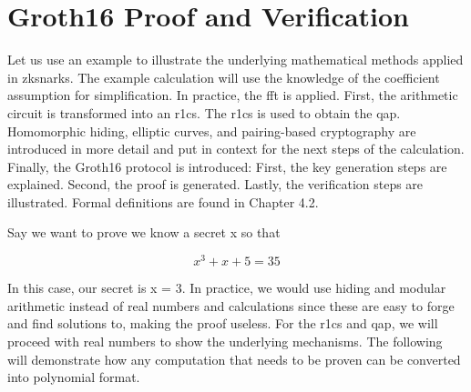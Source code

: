 \section{Groth16 Proof and Verification}
Let us use an example to illustrate the underlying mathematical methods applied in \acrshort{zksnark}s. The example calculation will use the knowledge of the coefficient assumption for simplification. In practice, the \acrshort{fft} is applied. First, the arithmetic circuit is transformed into an \acrshort{r1cs}. The \acrshort{r1cs} is used to obtain the \acrshort{qap}. Homomorphic hiding, elliptic curves, and pairing-based cryptography are introduced in more detail and put in context for the next steps of the calculation. Finally, the Groth16 protocol is introduced: First, the key generation steps are explained. Second, the proof is generated. Lastly, the verification steps are illustrated. Formal definitions are found in Chapter 4.2.

Say we want to prove we know a secret x so that

\[x^3 + x + 5 = 35\]

In this case, our secret is x = 3.
In practice, we would use hiding and modular arithmetic instead of real numbers and calculations since these are easy to forge and find solutions to, making the proof useless. For the \acrshort{r1cs} and \acrshort{qap}, we will proceed with real numbers to show the underlying mechanisms. The following will demonstrate how any computation that needs to be proven can be converted into polynomial format.

